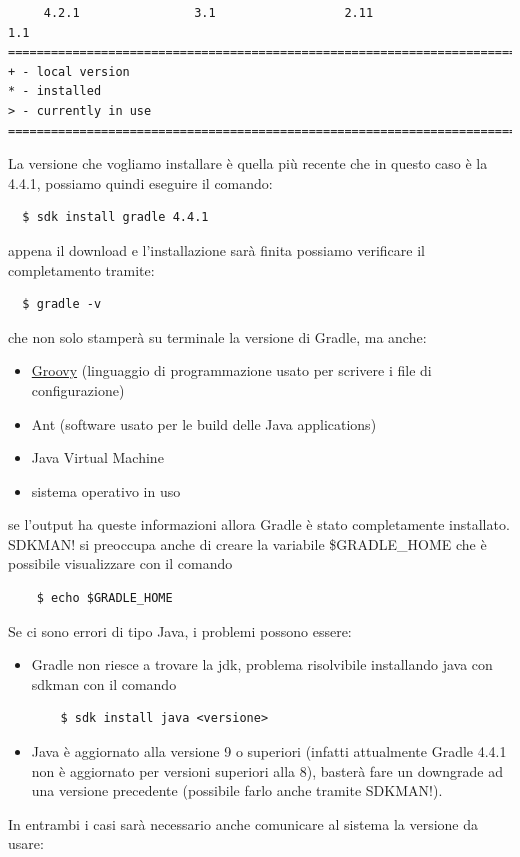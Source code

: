 \documentclass{article}
\begin{document}
\begin{flushleft}
\begin{verbatim}
     4.2.1                3.1                  2.11                 1.1            
================================================================================
+ - local version
* - installed
> - currently in use
================================================================================ \end{verbatim}
La versione che vogliamo installare è quella più recente che in questo caso è la 4.4.1, possiamo quindi eseguire il comando:
\begin{verbatim}
  $ sdk install gradle 4.4.1 \end{verbatim}
appena il download e l'installazione sarà finita possiamo verificare il completamento tramite:
\begin{verbatim}
  $ gradle -v \end{verbatim}
che non solo stamperà su terminale la versione di Gradle, ma anche:
\begin{itemize}
  \item \href{http://www.groovy-lang.org/}{Groovy} (linguaggio di programmazione usato per scrivere i file di configurazione)
  \item Ant (software usato per le build delle Java applications)
  \item Java Virtual Machine
  \item sistema operativo in uso
\end{itemize}
se l'output ha queste informazioni allora Gradle è stato completamente installato. SDKMAN! si preoccupa anche di creare la variabile \$GRADLE\_HOME che è possibile visualizzare con il comando 
\begin{verbatim} 
    $ echo $GRADLE_HOME \end{verbatim} 
Se ci sono errori di tipo Java, i problemi possono essere:
\begin{itemize}
  \item Gradle non riesce a trovare la jdk, problema risolvibile installando java con sdkman con il comando 
  \begin{verbatim}
    $ sdk install java <versione>  \end{verbatim}
  \item Java è aggiornato alla versione 9 o superiori (infatti attualmente Gradle 4.4.1 non è aggiornato per versioni superiori alla 8), basterà fare un downgrade ad una versione precedente (possibile farlo anche tramite SDKMAN!).
\end{itemize}
In entrambi i casi sarà necessario anche comunicare al sistema la versione da usare: 
\begin{verbatim}  

\end{verbatim}
\end{flushleft}
\end{document}
